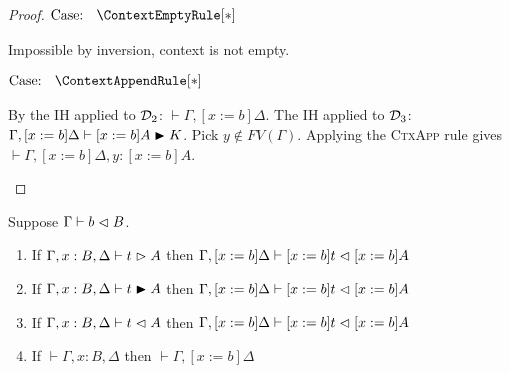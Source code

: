 \begin{proof}
    $\text{Case: }\begin{array}{c} \ContextEmptyRule[*] \end{array}$
    \begin{proofcase}
        Impossible by inversion, context is not empty.
    \end{proofcase}

    $\text{Case: }\begin{array}{c} \ContextAppendRule[*] \end{array}$
    \begin{proofcase}
        By the IH applied to $\mathcal{D}_{2}$: $\vdash \Gamma, [x := b]\Delta$.
        The IH applied to $\mathcal{D}_{3}$: $\Gamma, [x := b]\Delta \vdash [x := b]A \blacktriangleright K$.
        Pick $y \notin FV(\Gamma)$.
        Applying the \textsc{CtxApp} rule gives $\vdash \Gamma, [x := b]\Delta, y : [x := b]A$.
    \end{proofcase}
\end{proof}


\begin{lemma}
    Suppose $\Gamma \vdash b \vartriangleleft B$.
    \begin{enumerate}
        \item If $\Gamma, x : B, \Delta \vdash t \vartriangleright A$ then $\Gamma, [x := b]\Delta \vdash [x := b]t \vartriangleleft [x := b]A$
        \item If $\Gamma, x : B, \Delta \vdash t \blacktriangleright A$ then $\Gamma, [x := b]\Delta \vdash [x := b]t \vartriangleleft [x := b]A$
        \item If $\Gamma, x : B, \Delta \vdash t \vartriangleleft A$ then $\Gamma, [x := b]\Delta \vdash [x := b]t \vartriangleleft [x := b]A$
        \item If $\vdash \Gamma, x : B, \Delta$ then $\vdash \Gamma, [x := b]\Delta$
    \end{enumerate}
    \label{lem:2:subst_check}
\end{lemma}

